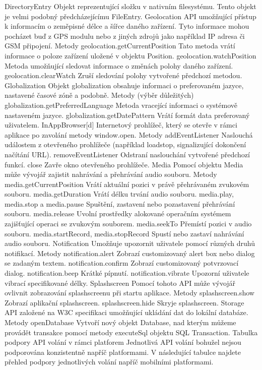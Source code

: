 DirectoryEntry
Objekt reprezentující složku v nativním filesystému. Tento objekt je velmi podobný předcházejícímu FileEntry.
Geolocation
API umožňující přístup k informacím o zeměpisné délce a šířce daného zařízení. Tyto informace mohou pocházet buď z GPS modulu nebo z jiných zdrojů jako například IP adresa či GSM připojení.
Metody
geolocation.getCurrentPosition
Tato metoda vrátí informace o poloze zařízení uložené v objektu Position.
geolocation.watchPosition
Metoda umožňující sledovat informace o změnách polohy daného zařízení.
geolocation.clearWatch
Zruší sledování polohy vytvořené předchozí metodou.
Globalization
Objekt globalization obsahuje informaci o preferovaném jazyce, nastavené časové zóně a podobně.
Metody (výběr důležitých)
globalization.getPreferredLanguage
Metoda vracející informaci o systémově nastaveném jazyce.
globalization.getDatePattern
Vrátí formát data preferovaný uživatelem.
InAppBrowser[d]
Internetový prohlížeč, který se otevře v rámci aplikace po zavolání metody window.open.
Metody
addEventListener
Naslouchá událostem z otevřeného prohlížeče (například loadstop, signalizující dokončení načítání URL).
removeEventListener
Odstraní naslouchání vytvořené předchozí funkcí.
close
Zavře okno otevřeného prohlížeče.
Media
Pomocí objektu Media může vývojář zajistit nahrávání a přehrávání audio souboru.
Metody
media.getCurrentPosition
Vrátí aktuální pozici v právě přehrávaném zvukovém souboru.
media.getDuration
Vrátí délku trvání audio souboru.
media.play, media.stop a media.pause
Spuštění, zastavení nebo pozastavení přehrávání souboru.
media.release
Uvolní prostředky alokované operačním systémem zajišťující operaci se zvukovým souborem.
media.seekTo
Přemístí pozici v audio souboru.
media.startRecord, media.stopRecord
Spustí nebo zastaví nahrávání audio souboru.
Notification
Umožňuje upozornit uživatele pomocí různých druhů notifikací.
Metody
notification.alert
Zobrazí customizovaný alert box nebo dialog se zadaným textem.
notification.confirm
Zobrazí customizovaný potvrzovací dialog.
notification.beep
Krátké pípnutí.
notification.vibrate
Upozorní uživatele vibrací specifikované délky.
Splashscreen
Pomocí tohoto API může vývojář ovlivnit zobrazování splashscreenu při startu aplikace.
Metody
splashscreen.show
Zobrazí aplikační splashscreen.
splashscreen.hide
Skryje splashscreen.
Storage
API založené na W3C specifikaci umožňující ukládání dat do lokální databáze.
Metody
openDatabase
Vytvoří nový objekt Database, nad kterým můžeme provádět transakce pomocí metody executeSql objektu SQL Transaction.
Tabulka podpory API volání v rámci platforem
Jednotlivá API volání bohužel nejsou podporována konzistentně napříč platformami. V následující tabulce najdete přehled podpory jednotlivých volání napříč mobilními platformami.

